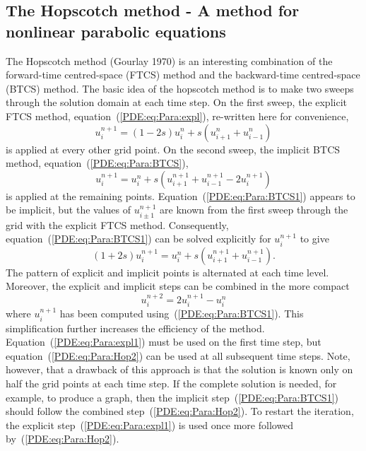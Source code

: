 \subsection[The Hopscotch method]{The Hopscotch method - A method for nonlinear parabolic equations}

The Hopscotch method (Gourlay 1970) is an interesting combination of
the forward-time centred-space (FTCS) method and the backward-time
centred-space (BTCS) method.  The basic idea of the hopscotch method
is to make two sweeps through the solution domain at each time step.
On the first sweep, the explicit FTCS method,
equation~(\ref{PDE:eq:Para:expl}), re-written here for convenience,
%
\begin{equation}
  u_{i}^{n+1} = (1-2s) u_{i}^{n} + s (u_{i+1}^{n}+u_{i-1}^{n})
  \label{PDE:eq:Para:expl1}
\end{equation}
%
is applied at every other grid point.  On the second sweep, the
implicit BTCS method, equation~(\ref{PDE:eq:Para:BTCS}),
%
\begin{equation}
  u_{i}^{n+1} = u_{i}^{n} + s (u_{i+1}^{n+1}+u_{i-1}^{n+1} - 2 u_{i}^{n+1})
  \label{PDE:eq:Para:BTCS1}
\end{equation}
%
is applied at the remaining points.
Equation~(\ref{PDE:eq:Para:BTCS1}) appears to be implicit, but the
values of $u_{i\pm1}^{n+1}$ are known from the first sweep through the
grid with the explicit FTCS method.  Consequently,
equation~(\ref{PDE:eq:Para:BTCS1}) can be solved explicitly for
$u_{i}^{n+1}$ to give
%
\begin{equation*}
  (1+2s)u_{i}^{n+1} = u_{i}^{n} + s ( u_{i+1}^{n+1} + u_{i-1}^{n+1} ).
\end{equation*}
%
The pattern of explicit and implicit points is alternated at each time
level.  Moreover, the explicit and implicit steps can be combined in
the more compact
%
\begin{equation}
  u_{i}^{n+2} = 2 u_{i}^{n+1} - u_{i}^{n}
  \label{PDE:eq:Para:Hop2}
\end{equation}
%
where $u_{i}^{n+1}$ has been computed using~(\ref{PDE:eq:Para:BTCS1}).
This simplification further increases the efficiency of the method.
Equation~(\ref{PDE:eq:Para:expl1}) must be used on the first time
step, but equation~(\ref{PDE:eq:Para:Hop2}) can be used at all
subsequent time steps.  Note, however, that a drawback of this
approach is that the solution is known only on half the grid points at
each time step.  If the complete solution is needed, for example, to
produce a graph, then the implicit step~(\ref{PDE:eq:Para:BTCS1})
should follow the combined step~(\ref{PDE:eq:Para:Hop2}).  To restart
the iteration, the explicit step~(\ref{PDE:eq:Para:expl1}) is used
once more followed by~(\ref{PDE:eq:Para:Hop2}).


